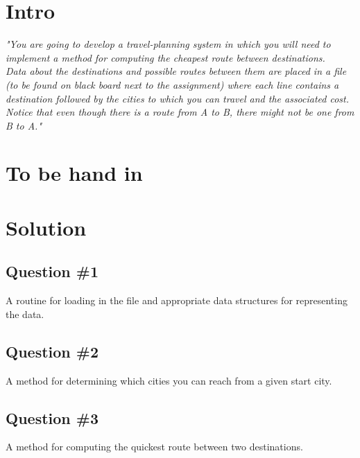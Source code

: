 \section{Intro}
\label{sec:intro}
\textit{"You are going to develop a travel-planning system in which you will need to implement a method for computing the cheapest route between destinations. \\
Data about the destinations and possible routes between them are placed in a file (to be found on black board next to the assignment) where each line contains a destination followed by the cities to which you can travel and the associated cost. \\
Notice that even though there is a route from A to B, there might not be one from B to A."}

\section{To be hand in}


\section{Solution}
\subsection{Question \#1}
A routine for loading in the file and appropriate data structures for representing the data.
\subsection{Question \#2}
A method for determining which cities you can reach from a given start city.
\subsection{Question \#3}
A method for computing the quickest route between two destinations.


